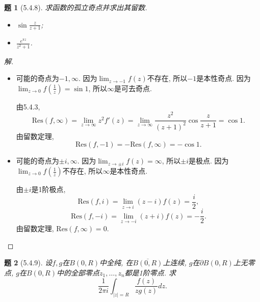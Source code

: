 \documentclass{article}[a4paper, 12pt]
\theoremstyle{mystyle}
\newtheorem{problem}{题}
\newenvironment{solution}{\begin{proof}[解]}{\end{proof}}
\begin{document}
\begin{problem}[5.4.8]
  求函数的孤立奇点并求出其留数.
  \begin{itemize}
    \item [(6)] \(\sin\frac{z}{z+1}\);
    \item [(8)] \(\frac{e^{\pi z}}{z^2+1}\).
  \end{itemize}
\end{problem}

\begin{solution}
  \begin{itemize}
    \item [(6)] 可能的奇点为\(-1,\infty\). 因为\(\lim_{z\to-1}f(z)\)不存在, 所以\(-1\)是本性奇点. 因为\(\lim_{z\to0}f(\frac{1}{z})=\sin1\), 所以\(\infty\)是可去奇点.
    
    由5.4.3, \[\text{Res}(f,\infty)=\lim_{z\to\infty}z^2f'(z)=\lim_{z\to\infty}\frac{z^2}{(z+1)^2}\cos\frac{z}{z+1}=\cos 1.\]
    由留数定理, \[\text{Res}(f,-1)=-\text{Res}(f,\infty)=-\cos 1.\]
    \item [(8)] 可能的奇点为\(\pm i,\infty\). 因为\(\lim_{z\to \pm i}f(z)=\infty\), 所以\(\pm i\)是极点. 因为\(\lim_{z\to0}f(\frac{1}{z})\)不存在, 所以\(\infty\)是本性奇点.
    
    由\(\pm i\)是1阶极点, \[\text{Res}(f,i)=\lim_{z\to i}(z-i)f(z)=\frac{i}{2},\] \[\text{Res}(f,-i)=\lim_{z\to -i}(z+i)f(z)=-\frac{i}{2}.\]
    由留数定理, \(\text{Res}(f,\infty)=0\). \qedhere
  \end{itemize}
\end{solution}

\begin{problem}[5.4.9]
  设\(f,g\)在\(B(0,R)\)中全纯, 在\(\overline{B(0,R)}\)上连续, \(g\)在\(\partial B(0,R)\)上无零点, \(g\)在\(B(0,R)\)中的全部零点\(z_1,\dots,z_n\)都是1阶零点. 求\[\frac{1}{2\pi i}\int_{|z|=R}\frac{f(z)}{zg(z)}dz.\]
\end{problem}
\end{document}
